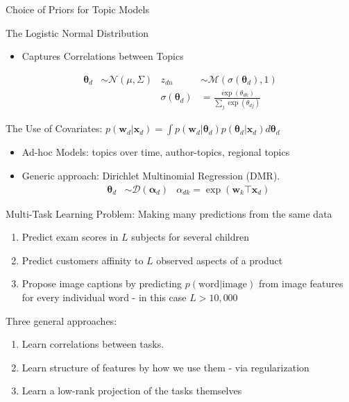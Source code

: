 \documentclass[xcolor=dvipsnames]{beamer}
\newcommand \vv[1] { \boldsymbol #1 }
\newcommand \wdoc      { { \vv{w}_d } }
\newcommand \thd[0]  { { \vv \theta_d } }
\newcommand \xd      { { \vv x_d } }
\newcommand \nor[2]   { \mathcal{N} \left( {#1}, {#2} \right) }
\newcommand \muln[2]  { \mathcal{M} \left( {#1},{#2} \right) }
\newcommand \dir[1]   { \mathcal{D} \left( {#1} \right) }
\newcommand \dir[1]   { \mathcal{D} \left( {#1} \right) }
\begin{document}


\begin{frame}{Choice of Priors for Topic Models}
 { 
    The Logistic Normal Distribution
    \begin{itemize}
            \item Captures Correlations between Topics\cite{Blei2006}
        \end{itemize}

        \begin{align*}
        \vv{\theta}_d & \sim \nor{\mu}{\Sigma} & z_{dn} &\sim \muln{\sigma(\vv{\theta}_d)}{1}\\
        & & \sigma(\vv{\theta}_d) & = \frac{\exp(\theta_{dk})}{\sum_j \exp(\theta_{dj})} 
        \end{align*}
    }
    
     { 
    The Use of Covariates: $p(\wdoc | \xd) = \int p(\wdoc|\thd) p(\thd|\xd) d\thd$
    \begin{itemize}
        \item Ad-hoc Models: topics over time\cite{Wang2006}, author-topics\cite{MacCallum2007}, regional topics\cite{Eisenstein2010}
        \item Generic approach: Dirichlet Multinomial Regression (DMR)\cite{Mimno2008}.
        \begin{align*}
        \vv{\theta}_d & \sim \dir{\vv{\alpha}_d} & \alpha_{dk} = \exp(\vv{w}_k\top\xd)
        \end{align*}

    \end{itemize} 
    }

\end{frame}




\begin{frame}{Multi-Task Learning}
Problem: Making many predictions from the same data
\begin{enumerate}
    \item Predict exam scores in $L$ subjects for several children\cite{Bonilla2008}
    \item Predict customers affinity to $L$ observed aspects of a product\cite{Allenby1999}
    \item Propose image captions by predicting $p(\text{word}|\text{image})$ from image features for every individual word\cite{Archambeau2011} - in this case $L > 10,000$
\end{enumerate}

\medskip 
\pause

Three general approaches:\cite{Caruana1997}
\begin{enumerate}
    \item Learn correlations between tasks.
    \item Learn structure of features by how we use them - via regularization
    \item Learn a low-rank projection of the tasks themselves
\end{enumerate}
\end{frame}
\end{document}
